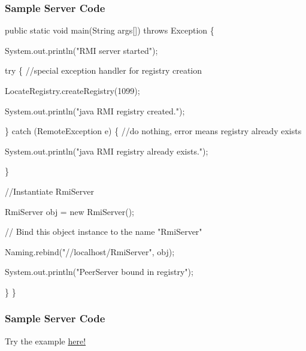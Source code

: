 \documentclass{beamer}
\begin{document}
    \begin{frame}
    	\frametitle{Sample Server Code}
    	
    	\begin{example}
    public static void main(String args[]) throws Exception \{
    
    	System.out.println("RMI server started");
    	
    	try \{ //special exception handler for registry creation
    		
    		LocateRegistry.createRegistry(1099); 
    		
    		System.out.println("java RMI registry created.");
    		
    	\} catch (RemoteException e) \{
    	//do nothing, error means registry already exists
    	
    	System.out.println("java RMI registry already exists.");

    \}
    
    //Instantiate RmiServer
    
    RmiServer obj = new RmiServer();
    
    // Bind this object instance to the name "RmiServer"

    Naming.rebind("//localhost/RmiServer", obj);

    System.out.println("PeerServer bound in registry");
    
\}
\}
    	\end{example}	
    \end{frame}  
        \begin{frame}
        	\frametitle{Sample Server Code}
Try the example \href{https://docs.oracle.com/javase/tutorial/rmi/overview.html}{here!}        	
	
        \end{frame} 
        
\end{document}
